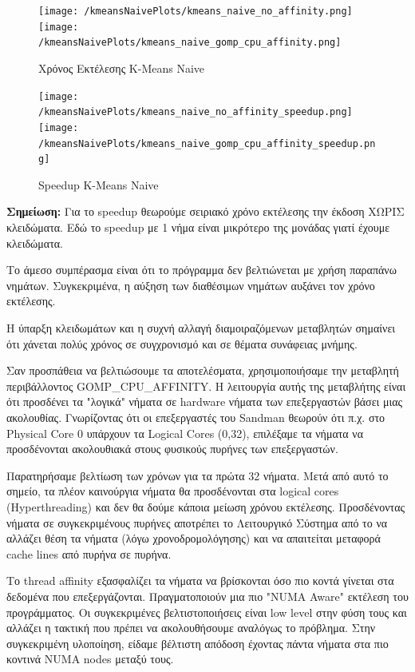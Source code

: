 \documentclass[../final_report.tex]{subfiles}
\begin{document}
\begin{figure}[H]
    \centering
    \texttt{[image: /kmeansNaivePlots/kmeans\_naive\_no\_affinity.png]}
    \texttt{[image: /kmeansNaivePlots/kmeans\_naive\_gomp\_cpu\_affinity.png]}
    \caption{Χρόνος Εκτέλεσης K-Means Naive}
    \label{fig:Χρόνος Εκτέλεσης K-Means Naive}
\end{figure}

\begin{figure}[H]
    \centering
    \texttt{[image: /kmeansNaivePlots/kmeans\_naive\_no\_affinity\_speedup.png]}
    \texttt{[image: /kmeansNaivePlots/kmeans\_naive\_gomp\_cpu\_affinity\_speedup.png]}
    \caption{Speedup K-Means Naive}
    \label{fig:Speedup K-Means Naive}
\end{figure}

\textbf{Σημείωση:} Για το speedup θεωρούμε σειριακό χρόνο εκτέλεσης την έκδοση ΧΩΡΙΣ κλειδώματα.
Εδώ το speedup με 1 νήμα είναι μικρότερο της μονάδας γιατί έχουμε κλειδώματα.
\vspace{4pt}

Το άμεσο συμπέρασμα είναι ότι το πρόγραμμα δεν βελτιώνεται με χρήση παραπάνω νημάτων. Συγκεκριμένα, 
η αύξηση των διαθέσιμων νημάτων αυξάνει τον χρόνο εκτέλεσης. 

Η ύπαρξη κλειδωμάτων και η συχνή αλλαγή διαμοιραζόμενων μεταβλητών σημαίνει ότι χάνεται πολύς χρόνος σε
συγχρονισμό και σε θέματα συνάφειας μνήμης. 

Σαν προσπάθεια να βελτιώσουμε τα αποτελέσματα, χρησιμοποιήσαμε την μεταβλητή περιβάλλοντος GOMP\_CPU\_AFFINITY.
Η λειτουργία αυτής της μεταβλήτης είναι ότι προσδένει τα "λογικά" νήματα σε hardware νήματα των επεξεργαστών βάσει μιας ακολουθίας.
Γνωρίζοντας ότι οι επεξεργαστές του Sandman θεωρούν ότι π.χ. στο Physical Core 0 υπάρχουν τα Logical Cores (0,32),
επιλέξαμε τα νήματα να προσδένονται ακολουθιακά στους φυσικούς πυρήνες των επεξεργαστών.

Παρατηρήσαμε βελτίωση των χρόνων για τα πρώτα 32 νήματα. Μετά από αυτό το σημείο, τα πλέον καινούργια νήματα
θα προσδένονται στα logical cores (Hyperthreading) και δεν θα δούμε κάποια μείωση χρόνου εκτέλεσης.
Προσδένοντας νήματα σε συγκεκριμένους πυρήνες αποτρέπει το Λειτουργικό Σύστημα από το να αλλάζει θέση τα νήματα (λόγω χρονοδρομολόγησης)
και να απαιτείται μεταφορά cache lines από πυρήνα σε πυρήνα.

Το thread affinity εξασφαλίζει τα νήματα να βρίσκονται όσο πιο κοντά γίνεται στα δεδομένα που επεξεργάζονται. Πραγματοποιούν
μια πιο "NUMA Aware" εκτέλεση του προγράμματος. Οι συγκεκριμένες βελτιστοποιήσεις είναι low level στην φύση τους και αλλάζει η 
τακτική που πρέπει να ακολουθήσουμε αναλόγως το πρόβλημα. Στην συγκεκριμένη υλοποίηση, είδαμε βέλτιστη απόδοση έχοντας πάντα νήματα
στα πιο κοντινά NUMA nodes μεταξύ τους. 
\end{document}
